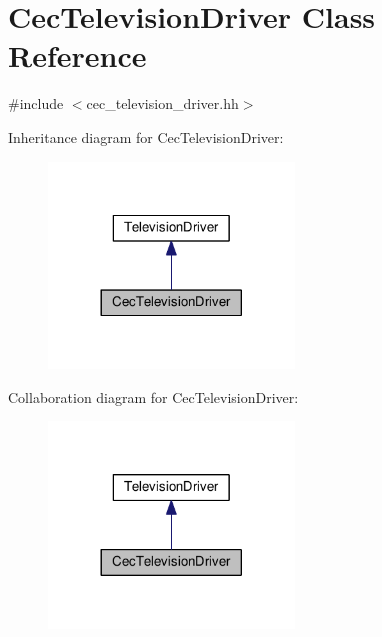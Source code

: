 \hypertarget{classCecTelevisionDriver}{\section{Cec\+Television\+Driver Class Reference}
\label{classCecTelevisionDriver}
}


{\ttfamily \#include $<$cec\+\_\+television\+\_\+driver.\+hh$>$}



Inheritance diagram for Cec\+Television\+Driver\+:
\nopagebreak
\begin{figure}[H]
\begin{center}
\leavevmode
\includegraphics[width=185pt]{classCecTelevisionDriver__inherit__graph}
\end{center}
\end{figure}


Collaboration diagram for Cec\+Television\+Driver\+:
\nopagebreak
\begin{figure}[H]
\begin{center}
\leavevmode
\includegraphics[width=185pt]{classCecTelevisionDriver__coll__graph}
\end{center}
\end{figure}
